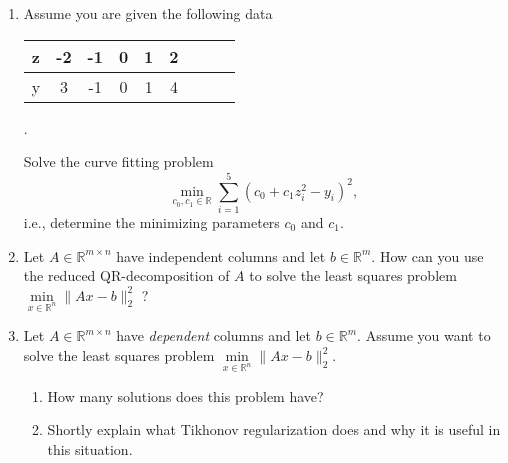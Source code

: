 \begin{enumerate}

	\item Assume you are given the following data
	\begin{center}
		\begin{tabular}{|l|c|c|c|c|c|c||c|c|}\hline
			z&-2&-1&0&1&2\\ 
			\hline
			y&3&-1&0&1&4\\
			\hline
		\end{tabular}.
	\end{center}
	Solve the curve fitting problem
	$$
	\min\limits_{c_0, c_1 \in \mathbb{R}} \sum_{i=1}^5 (c_0 + c_1z_i^2 - y_i)^2,
	$$
	i.e., determine the minimizing parameters $c_0$ and $c_1$.
	\item Let  $A \in \mathbb{R}^{m \times n}$ have independent columns and let $b \in \mathbb{R}^{m}$. How can you use the reduced QR-decomposition of $A$ to solve the least squares problem $
\min\limits_{x \in \mathbb{R}^n } \| Ax - b \|_2^2
$ ?
\item Let  $A \in \mathbb{R}^{m \times n}$ have \textit{dependent} columns and let $b \in \mathbb{R}^{m}$. Assume you want to solve the least squares problem $\min\limits_{x \in \mathbb{R}^n } \| Ax - b \|_2^2$.
\begin{enumerate}
	\item How many solutions does this problem have?
	\item Shortly explain what Tikhonov regularization does and why it is useful in this situation.
\end{enumerate}
\end{enumerate}
 